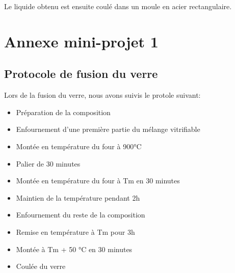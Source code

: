 \documentclass{article}
\begin{document}
Le liquide obtenu est ensuite coulé dans un moule en acier rectangulaire.\\

\section{Annexe mini-projet 1}
\subsection{Protocole de fusion du verre}

Lors de la fusion du verre, nous avons suivis le protole suivant: \\

\begin{itemize}
    \item Préparation de la composition
    \item Enfournement d'une première partie du mélange vitrifiable
    \item Montée en température du four à 900°C
    \item Palier de 30 minutes
    \item Montée en température du four à Tm en 30 minutes
    \item Maintien de la température pendant 2h
    \item Enfournement du reste de la composition
    \item Remise en température à Tm pour 3h
    \item Montée à Tm + 50 °C en 30 minutes
    \item Coulée du verre
\end{itemize}
\end{document}
